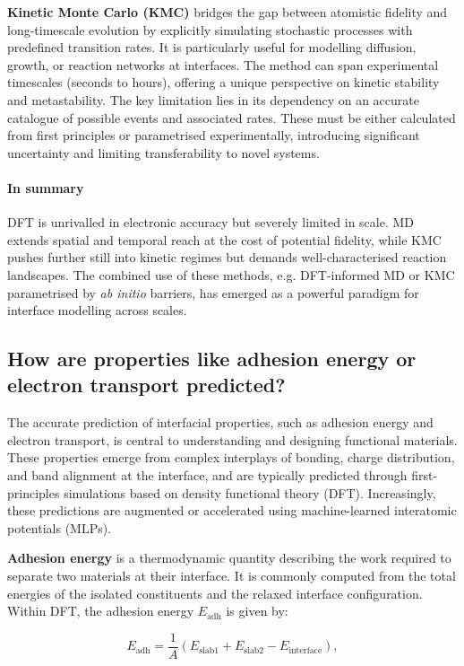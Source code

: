 \textbf{Kinetic Monte Carlo (KMC)} bridges the gap between atomistic fidelity and long-timescale evolution by explicitly simulating stochastic processes with predefined transition rates. It is particularly useful for modelling diffusion, growth, or reaction networks at interfaces. The method can span experimental timescales (seconds to hours), offering a unique perspective on kinetic stability and metastability. The key limitation lies in its dependency on an accurate catalogue of possible events and associated rates. These must be either calculated from first principles or parametrised experimentally, introducing significant uncertainty and limiting transferability to novel systems.

\paragraph{In summary} DFT is unrivalled in electronic accuracy but severely limited in scale. MD extends spatial and temporal reach at the cost of potential fidelity, while KMC pushes further still into kinetic regimes but demands well-characterised reaction landscapes. The combined use of these methods, e.g. DFT-informed MD or KMC parametrised by \textit{ab initio} barriers, has emerged as a powerful paradigm for interface modelling across scales.

\subsection{How are properties like adhesion energy or electron transport predicted?}

The accurate prediction of interfacial properties, such as adhesion energy and electron transport, is central to understanding and designing functional materials. These properties emerge from complex interplays of bonding, charge distribution, and band alignment at the interface, and are typically predicted through first-principles simulations based on density functional theory (DFT). Increasingly, these predictions are augmented or accelerated using machine-learned interatomic potentials (MLPs).

\textbf{Adhesion energy} is a thermodynamic quantity describing the work required to separate two materials at their interface. It is commonly computed from the total energies of the isolated constituents and the relaxed interface configuration. Within DFT, the adhesion energy $E_\mathrm{adh}$ is given by:

\[ E_\mathrm{adh} = \frac{1}{A} \left( E_\mathrm{slab1} + E_\mathrm{slab2} - E_\mathrm{interface} \right), \]

